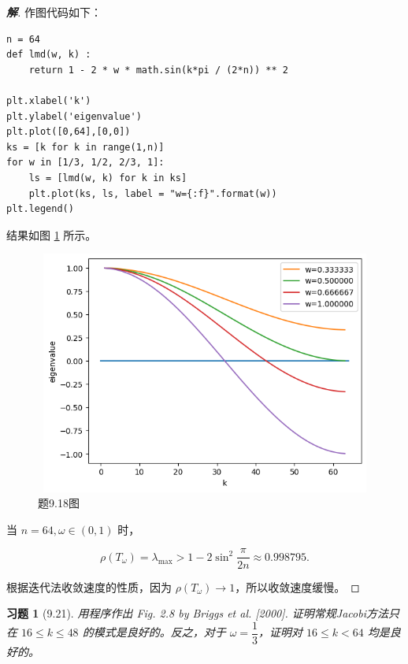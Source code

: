 \documentclass{ctexart}
\newtheorem{ex}{习题}
\newenvironment{sol}{\begin{proof}[\bf 解]}{\end{proof}}
\begin{document}
\begin{sol}

作图代码如下：

\begin{lstlisting}
n = 64
def lmd(w, k) :
    return 1 - 2 * w * math.sin(k*pi / (2*n)) ** 2

plt.xlabel('k')
plt.ylabel('eigenvalue')
plt.plot([0,64],[0,0])
ks = [k for k in range(1,n)]
for w in [1/3, 1/2, 2/3, 1]:
    ls = [lmd(w, k) for k in ks]
    plt.plot(ks, ls, label = "w={:f}".format(w))
plt.legend()
\end{lstlisting}

结果如图 \ref{9.18-fig1} 所示。

\begin{figure}[h]
    \centering
	\includegraphics[width = 12cm, height = 8cm]{18.png}
    \caption{题9.18图}
	\label{9.18-fig1}
\end{figure}

当 $n=64,\omega\in (0,1)$ 时，

\begin{equation}
    \rho(T_{\omega}) = \lambda_{\max} > 1 - 2\sin^2 \dfrac{\pi}{2n} \approx 0.998795.
\end{equation}

根据迭代法收敛速度的性质，因为 $\rho(T_{\omega})\rightarrow 1$，所以收敛速度缓慢。

\end{sol}

\begin{ex}[9.21]
    用程序作出 Fig. 2.8 by Briggs et al. [2000]. 证明常规Jacobi方法只在 $16\leq k\leq 48$ 的模式是良好的。反之，对于 $\omega = \dfrac 13$，证明对 $16\leq k<64$ 均是良好的。
\end{ex}
\end{document}
